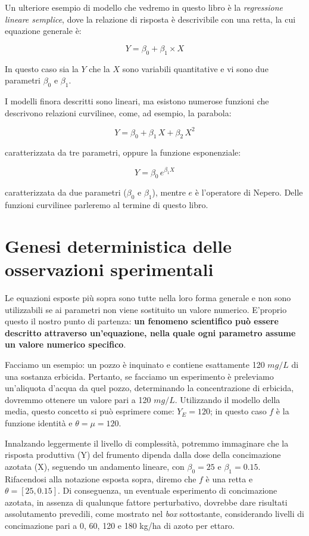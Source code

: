 \documentclass[a4paper,12pt,oneside]{book}
\begin{document}
Un ulteriore esempio di modello che vedremo in questo libro è la \emph{regressione lineare semplice}, dove la relazione di risposta è descrivibile con una retta, la cui equazione generale è:

\[ Y = \beta_0 + \beta_1 \times X \]

In questo caso sia la \(Y\) che la \(X\) sono variabili quantitative e vi sono due parametri \(\beta_0\) e \(\beta_1\).

I modelli finora descritti sono lineari, ma esistono numerose funzioni che descrivono relazioni curvilinee, come, ad esempio, la parabola:

\[ Y = \beta_0 + \beta_1 \, X + \beta_2 \, X^2\]

caratterizzata da tre parametri, oppure la funzione esponenziale:

\[ Y = \beta_0 \, e^{\beta_1 X} \]

caratterizzata da due parametri (\(\beta_0\) e \(\beta_1\)), mentre \(e\) è l'operatore di Nepero. Delle funzioni curvilinee parleremo al termine di questo libro.

\hypertarget{genesi-deterministica-delle-osservazioni-sperimentali}{%
\section{Genesi deterministica delle osservazioni sperimentali}\label{genesi-deterministica-delle-osservazioni-sperimentali}}

Le equazioni esposte più sopra sono tutte nella loro forma generale e non sono utilizzabili se ai parametri non viene sostituito un valore numerico. E'proprio questo il nostro punto di partenza: \textbf{un fenomeno scientifico può essere descritto attraverso un'equazione, nella quale ogni parametro assume un valore numerico specifico}.

Facciamo un esempio: un pozzo è inquinato e contiene esattamente 120 \(mg/L\) di una sostanza erbicida. Pertanto, se facciamo un esperimento è preleviamo un'aliquota d'acqua da quel pozzo, determinando la concentrazione di erbicida, dovremmo ottenere un valore pari a 120 \(mg/L\). Utilizzando il modello della media, questo concetto si può esprimere come: \(Y_E = 120\); in questo caso \(f\) è la funzione identità e \(\theta = \mu = 120\).

Innalzando leggermente il livello di complessità, potremmo immaginare che la risposta produttiva (Y) del frumento dipenda dalla dose della concimazione azotata (X), seguendo un andamento lineare, con \(\beta_0 = 25\) e \(\beta_1 = 0.15\). Rifacendosi alla notazione esposta sopra, diremo che \(f\) è una retta e \(\theta = [25, 0.15]\). Di conseguenza, un eventuale esperimento di concimazione azotata, in assenza di qualunque fattore perturbativo, dovrebbe dare risultati assolutamento prevedili, come mostrato nel \emph{box} sottostante, considerando livelli di concimazione pari a 0, 60, 120 e 180 kg/ha di azoto per ettaro.
\end{document}
